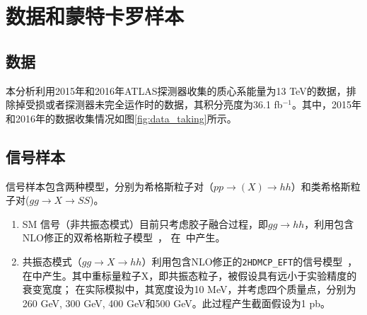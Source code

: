 \section{数据和蒙特卡罗样本}\label{chap:dataMC}

\subsection{数据}
本分析利用2015年和2016年ATLAS探测器收集的质心系能量为13 TeV的数据，排除掉受损或者探测器未完全运作时的数据，其积分亮度为36.1 fb$^{-1}$。其中，2015年和2016年的数据收集情况如图\ref{fig:data_taking}所示。


\subsection{信号样本}
信号样本包含两种模型，分别为希格斯粒子对（$pp\rightarrow (X) \rightarrow hh$）和类希格斯粒子对($gg \rightarrow X \rightarrow SS$)\cite{ExoticHiggsTheory}。
\begin{enumerate}
    \item SM 信号（非共振态模式）目前只考虑胶子融合过程，即$gg\rightarrow hh$，利用包含NLO修正的双希格斯粒子模型~\cite{Frederix:2014hta}，
    在\MGMCatNLO~\cite{madgraph5amcnlo,syscalc}中产生。
    \item 共振态模式（$gg\rightarrow X\rightarrow  hh$）利用包含NLO修正的\texttt{2HDMCP\_EFT}的信号模型~\cite{MG5-HH-LO}，在\MGMCatNLO 中产生。其中重标量粒子X，即共振态粒子，被假设具有远小于实验精度的衰变宽度；
在实际模拟中，其宽度设为10 MeV，并考虑四个质量点，分别为260 GeV, 300 GeV, 400 GeV和500 GeV。此过程产生截面假设为1 pb。 
\end{enumerate}

